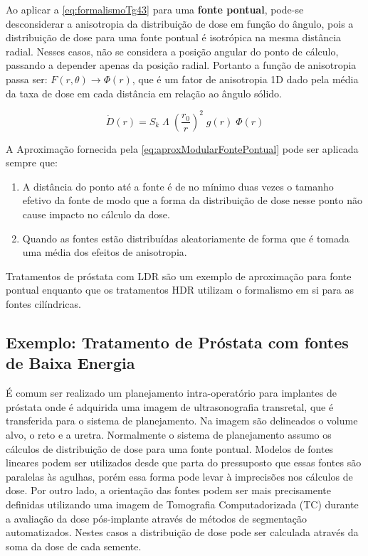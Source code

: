 \documentclass[11pt,a4paper]{article}
\newcounter{exemplo}
\begin{document}
			Ao aplicar a   \ref{eq:formalismoTg43} para uma \textbf{\textcolor{CarnationPink}{fonte pontual}}, pode-se desconsiderar a anisotropia da distribuição de dose em função do ângulo,  pois a distribuição de dose para uma fonte pontual é isotrópica na mesma distância radial. Nesses casos, não se considera a posição angular do ponto de cálculo, passando a depender apenas da posição radial. Portanto a função de anisotropia passa ser: $F(r, \theta) \rightarrow \Phi (r)$,  que é um fator de anisotropia 1D dado pela média da taxa de dose em cada distância em relação ao ângulo sólido.
			
			\begin{equation}
				\dot{D}(r) = S_k \; \varLambda \; \left(\frac{r_0}{r} \right)^2 \; g(r) \; \Phi (r)
				\label{eq:aproxModularFontePontual}
			\end{equation}
			
			A Aproximação fornecida pela   \ref{eq:aproxModularFontePontual} pode ser aplicada sempre que:

			\begin{enumerate}
				\item A distância do ponto até a fonte é de no mínimo duas vezes o tamanho efetivo da fonte de modo que a forma da distribuição de dose nesse ponto não cause impacto no cálculo da dose.
				\item Quando as fontes estão distribuídas aleatoriamente de forma que é tomada uma média dos efeitos de anisotropia.
			\end{enumerate}

			Tratamentos de próstata com LDR são um exemplo de aproximação para fonte pontual enquanto que os tratamentos HDR utilizam o formalismo em si para as fontes cilíndricas.

		\subsection*{\textcolor{CarnationPink}{Exemplo: Tratamento de Próstata com fontes de Baixa Energia}}

			É comum ser realizado um planejamento intra-operatório para implantes de próstata onde é adquirida uma imagem de ultrasonografia transretal, que é transferida para o sistema de planejamento. Na imagem são delineados o volume alvo, o reto e a uretra. Normalmente o sistema de planejamento assumo os cálculos de distribuição de dose para uma fonte pontual. Modelos de fontes lineares podem ser utilizados desde que parta do pressuposto que essas fontes são paralelas às agulhas, porém essa forma pode levar à imprecisões nos cálculos de dose. Por outro lado, a orientação das fontes podem ser mais precisamente definidas utilizando uma imagem de Tomografia Computadorizada (TC) durante a avaliação da dose pós-implante através de métodos de segmentação automatizados. Nestes casos a distribuição de dose pode ser calculada através da soma da dose de cada semente.
\end{document}
